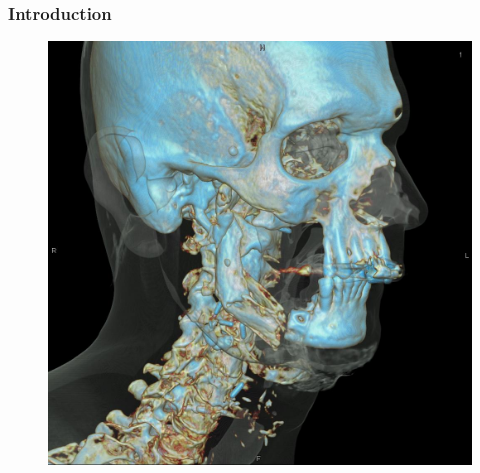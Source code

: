 

\begin{frame}

	\frametitle{Introduction}

	\begin{figure}[tb]
		\centering
		\begin{minipage}{.45\linewidth}
			\centering
			\includegraphics[width=0.85\linewidth]{images/head_vrt}
			\label{fig:ct_intro_1}
		\end{minipage}%
		\begin{minipage}{.45\linewidth}
			\centering

\end{minipage}
\end{figure}
\end{frame}
